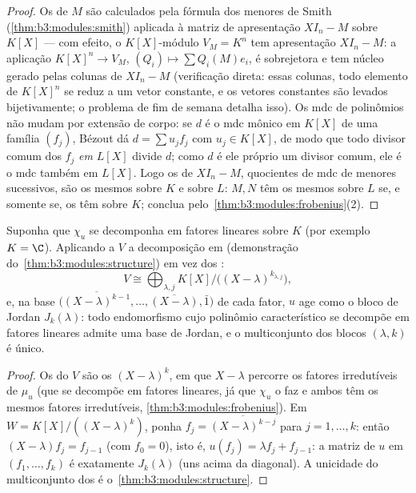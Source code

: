 \begin{proof}
Os  de $M$ são calculados pela fórmula dos
menores de Smith (\cref{thm:b3:modules:smith}) aplicada à matriz de apresentação
$XI_n - M$ sobre $K[X]$ --- com efeito, o $K[X]$-módulo $V_M = K^n$ tem
apresentação $XI_n - M$: a aplicação $K[X]^n \to V_M$, $(Q_i) \mapsto \sum Q_i(M)e_i$, é sobrejetora e tem
núcleo gerado pelas colunas de $XI_n - M$ (verificação direta:  essas
colunas, todo elemento de $K[X]^n$ se reduz a um vetor constante, e
os vetores constantes são levados bijetivamente; o problema de fim de
semana detalha isso). Os mdc de polinômios não mudam por extensão de
corpo: se $d$ é o mdc mônico em $K[X]$ de uma família
$(f_j)$, Bézout dá $d = \sum u_jf_j$ com $u_j \in K[X]$, de modo que todo divisor comum
dos $f_j$ \emph{em $L[X]$} divide $d$; como $d$ é ele
próprio um divisor comum, ele é o mdc também em $L[X]$. Logo os
 de $XI_n - M$, quocientes de mdc de menores sucessivos,
são os mesmos sobre $K$ e sobre $L$: $M, N$ têm os mesmos
 sobre $L$ se, e somente se, os têm sobre
$K$; conclua pelo~\cref{thm:b3:modules:frobenius}(2).
\end{proof}

\begin{theorem}\label{thm:b3:modules:jordan}
Suponha que $\chi_u$ se decomponha em fatores lineares sobre
$K$ (por exemplo $K = \C$). Aplicando a $V$ a decomposição
em  (demonstração do~\cref{thm:b3:modules:structure}) em vez dos
:
\[
V \cong \bigoplus_{\lambda, j} K[X]\big/\bigl((X -
\lambda)^{k_{\lambda,j}}\bigr),
\]
e, na base $\bigl(\overline{(X-\lambda)^{k-1}}, \dots,
\overline{(X - \lambda)}, \bar 1\bigr)$ de cada fator, $u$ age como o bloco de Jordan
$J_k(\lambda)$: todo endomorfismo cujo polinômio característico se decompõe em
fatores lineares admite uma base de Jordan, e o multiconjunto dos
blocos $(\lambda, k)$ é único.
\end{theorem}

\begin{proof}
Os  do  $V$ são os $(X - \lambda)^k$, em
que $X - \lambda$ percorre os fatores irredutíveis de $\mu_u$ (que se
decompõe em fatores lineares, já que $\chi_u$ o faz e ambos têm os
mesmos fatores irredutíveis, \cref{thm:b3:modules:frobenius}). Em $W = K[X]/((X-\lambda)^k)$, ponha $f_j = \overline{(X - \lambda)^{k-j}}$
para $j = 1, \dots, k$: então $(X - \lambda)f_j = f_{j-1}$ (com $f_0 = 0$), isto é, $u(f_j)
= \lambda f_j + f_{j-1}$: a matriz de
$u$ em $(f_1, \dots,
f_k)$ é exatamente $J_k(\lambda)$ (uns acima da diagonal). A
unicidade do multiconjunto dos  é
o~\cref{thm:b3:modules:structure}.
\end{proof}

